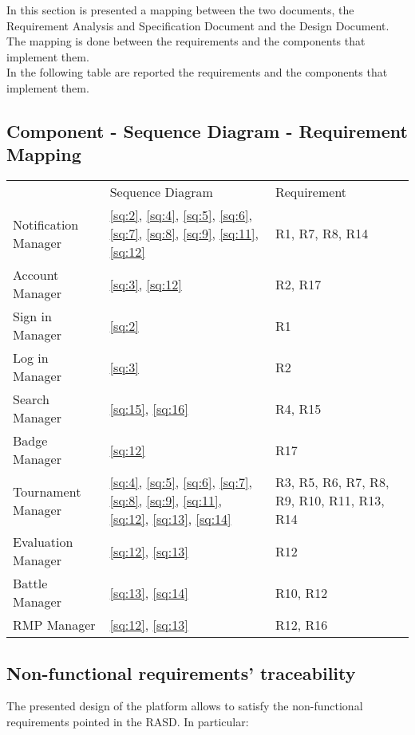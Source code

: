 In this section is presented a mapping between the two documents, the Requirement Analysis and Specification Document and the Design Document. The mapping is done between the requirements and the components that implement them.\\
In the following table are reported the requirements and the components that implement them.

\subsection{Component - Sequence Diagram - Requirement Mapping} \label{uc:mapping}
\begin{center}
    \begin{tabu}{|X[.3]|X[.4]|X[.3]|} \hline \everyrow{\hline}
        & Sequence Diagram & Requirement \\
        Notification Manager & \ref{sq:2}, \ref{sq:4}, \ref{sq:5}, \ref{sq:6}, \ref{sq:7}, \ref{sq:8}, \ref{sq:9}, \ref{sq:11}, \ref{sq:12}  & R1, R7, R8, R14\\ 
        Account Manager & \ref{sq:3}, \ref{sq:12}  & R2, R17\\
        Sign in Manager & \ref{sq:2} & R1\\
        Log in Manager & \ref{sq:3} & R2\\
        Search Manager & \ref{sq:15}, \ref{sq:16}& R4, R15\\
        Badge Manager & \ref{sq:12} & R17\\
        Tournament Manager & \ref{sq:4}, \ref{sq:5}, \ref{sq:6}, \ref{sq:7}, \ref{sq:8}, \ref{sq:9}, \ref{sq:11}, \ref{sq:12}, \ref{sq:13}, \ref{sq:14} & R3, R5, R6, R7, R8, R9, R10, R11, R13, R14\\
        Evaluation Manager & \ref{sq:12}, \ref{sq:13} & R12\\
        Battle Manager & \ref{sq:13}, \ref{sq:14} & R10, R12\\
        RMP Manager & \ref{sq:12}, \ref{sq:13} & R12, R16\\
    \end{tabu}
\end{center}

\subsection{Non-functional requirements' traceability}
The presented design of the platform allows to satisfy the non-functional requirements pointed in the RASD. In particular:
